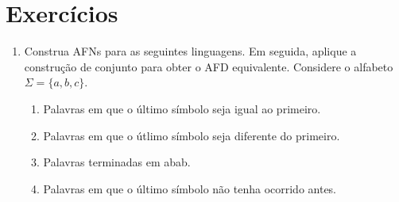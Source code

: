 \documentclass[a4paper]{article}
\theoremstyle{definition}
\begin{document}
  \section{Exercícios}

  \begin{enumerate}
    \item Construa AFNs para as seguintes linguagens. Em seguida, aplique a
      construção de conjunto para obter o AFD equivalente.
      Considere o alfabeto $\Sigma=\{a,b,c\}$.
      \begin{enumerate}
        \item Palavras em que o último símbolo seja igual ao primeiro.
        \item Palavras em que o útlimo símbolo seja diferente do primeiro.
        \item Palavras terminadas em abab.
        \item Palavras em que o último símbolo não tenha ocorrido antes.
        \end{enumerate}
  \end{enumerate}
\end{document}
